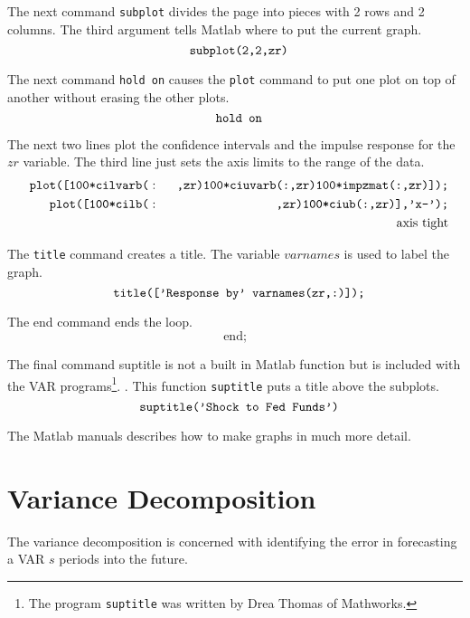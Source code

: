 \documentclass{article}
\begin{document}
The next command \texttt{subplot} divides the page into pieces with 2 rows
and 2 columns. The third argument tells Matlab where to put the current
graph. 
\begin{equation*}
\text{\texttt{subplot(2,2,zr)}}
\end{equation*}

The next command \texttt{hold on} causes the \texttt{plot} command to put
one plot on top of another without erasing the other plots. 
\begin{equation*}
\text{\texttt{hold on}}
\end{equation*}

The next two lines plot the confidence intervals and the impulse response
for the $zr$ variable. The third line just sets the axis limits to the range
of the data. 
\begin{eqnarray*}
\text{\texttt{plot([100*cilvarb(}} &:&\text{\texttt{%
,zr)100*ciuvarb(:,zr)100*impzmat(:,zr)]);}} \\
\text{\texttt{plot([100*cilb(}} &:&\text{\texttt{,zr)100*ciub(:,zr)],'x-');}}
\\
&&\text{axis tight}
\end{eqnarray*}

The \texttt{title} command creates a title. The variable $varnames$ is used
to label the graph. 
\begin{equation*}
\text{\texttt{title(['Response by' varnames(zr,:)]);}}
\end{equation*}

The end command ends the loop. 
\begin{equation*}
\text{end;}
\end{equation*}

The final command suptitle is not a built in Matlab function but is included
with the VAR programs\footnote{%
The program \texttt{suptitle} was written by Drea Thomas of Mathworks.}. .
This function \texttt{suptitle} puts a title above the subplots. 
\begin{equation*}
\text{\texttt{suptitle('Shock to Fed Funds')}}
\end{equation*}

The Matlab manuals describes how to make graphs in much more detail.

\section{Variance Decomposition}

The variance decomposition is concerned with identifying the error in
forecasting a VAR $s$ periods into the future.
\end{document}
